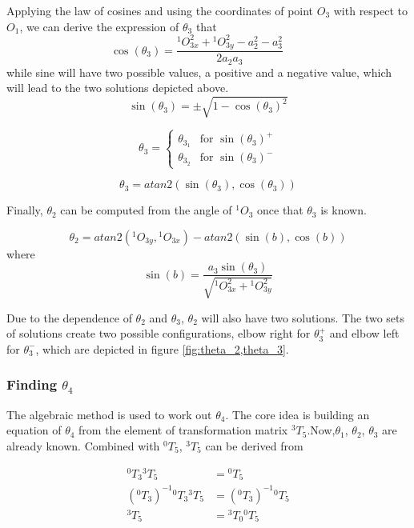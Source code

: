 \documentclass{article}
\renewcommand{\c}[1]{\cos(\theta_{#1})}
\newcommand{\s}[1]{\sin(\theta_{#1})}
\newcommand{\T}[2]{{}^{#1}T_{#2}}
\renewcommand{\O}[2]{{}^{#1}O_{#2}}
\begin{document}
Applying the law of cosines and using the coordinates of point $O_3$ with respect to $O_1$, we can derive the expression of $\theta_3$ that
\begin{equation*}
\c{3} = \frac{\O{1}{3x}^2 + \O{1}{3y}^2 - a_2^2 - a_3^2}{2a_2a_3}\qquad
\end{equation*}
while sine will have two possible values, a positive and a negative value, which will lead to the two solutions depicted above.
\begin{equation*}
\s{3} = \pm\sqrt{1-\c{3}^2}
\end{equation*}

\begin{equation*}
\theta_{3} = \begin{cases} 
   \theta_{3_1} & \text{for } {\s{3}}^+ \\
   \theta_{3_2} & \text{for } {\s{3}}^-
  \end{cases}
\end{equation*}

\begin{equation}
\theta_{3} = atan2(\s{3},\c{3})
\end{equation}

Finally, $\theta_2$ can be computed from the angle of $\O{1}{3}$ once that $\theta_3$ is known.

\begin{equation}
\theta_{2} = atan2(\O{1}{3y},\O{1}{3x})-atan2(\sin(b),\cos(b) )
\end{equation}
where
\begin{equation*}
\sin(b)= \frac{a_3\s{3}}{\sqrt{\O{1}{3x}^2+\O{1}{3y}^2}}
\end{equation*}

Due to the dependence of $\theta_2$ and $\theta_3$,  $\theta_2$ will also have two solutions. The two sets of solutions create two possible configurations, elbow right for $\theta_3^+$ and elbow left for $\theta_3^-$, which are depicted in figure \ref{fig:theta_2,theta_3}.

\subsubsection{Finding $\theta_4$}
The algebraic method is used to work out $\theta_4$. The core idea is building an equation of $\theta_4$ from the element of transformation matrix $\T{3}{5}$.Now,$\theta_1$, $\theta_2$, $\theta_3$ are already known. Combined with  $\T{0}{5}$,  $\T{3}{5}$ can be derived from

\begin{align}
\label{eq:inverse.t_35}
\T{0}{3}\T{3}{5} & = \T{0}{5} \nonumber \\
{(\T{0}{3})}^{-1}\T{0}{3}\T{3}{5}& = {(\T{0}{3})}^{-1} \T{0}{5} \nonumber \\
\T{3}{5} & = \T{3}{0} \T{0}{5}
\end{align}
\end{document}
